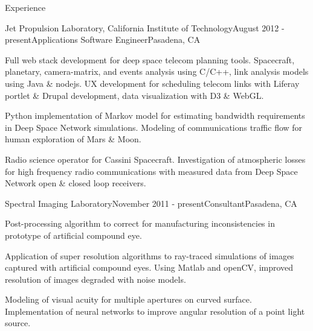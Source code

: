 \documentclass{resume} %
\begin{document}





\begin{rSection}{Experience}

\begin{rSubsection}{Jet Propulsion Laboratory, California Institute of Technology}{August 2012 - present}{Applications Software Engineer}{Pasadena, CA}
\item Full web stack development for deep space telecom planning tools. Spacecraft, planetary, camera-matrix, and events analysis using C/C++, link analysis models using Java \& nodejs. UX development for scheduling telecom links with Liferay portlet \& Drupal development, data visualization with D3 \& WebGL. 
\item  Python implementation of Markov model for estimating bandwidth requirements in Deep Space Network simulations. Modeling of communications traffic flow for human exploration of Mars \& Moon. 
\item Radio science operator for Cassini Spacecraft. Investigation of atmospheric losses for high frequency radio communications with measured data from Deep Space Network open \& closed loop receivers. 


\end{rSubsection}


\begin{rSubsection}{Spectral Imaging Laboratory}{November 2011 - present}{Consultant}{Pasadena, CA}
\item Post-processing algorithm to correct for manufacturing inconsistencies in prototype of artificial compound eye.
\item Application of super resolution algorithms to ray-traced simulations of images captured with artificial compound eyes. Using Matlab and openCV, improved resolution of images degraded with noise models.
\item Modeling of visual acuity for multiple apertures on curved surface. Implementation of neural networks to improve angular resolution of a point light source. 
\end{rSubsection}


\end{rSection}
\end{document}
